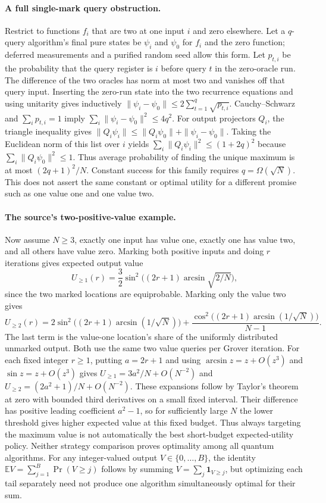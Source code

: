 \documentclass[11pt]{article}
\begin{document}
\paragraph{A full single-mark query obstruction.}
Restrict to functions $f_i$ that are two at one input $i$ and zero elsewhere.
Let a $q$-query algorithm's final pure states be $\psi_i$ and $\psi_0$ for
$f_i$ and the zero function; deferred measurements and a purified random
seed allow this form. Let $p_{t,i}$ be the probability that the query register
is $i$ before query $t$ in the zero-oracle run. The difference of the two
oracles has norm at most two and vanishes off that query input.
Inserting the zero-run state into the two recurrence equations and using
unitarity gives inductively
$\|\psi_i-\psi_0\|\le2\sum_{t=1}^q\sqrt{p_{t,i}}$.
Cauchy--Schwarz and $\sum_i p_{t,i}=1$ imply
$\sum_i\|\psi_i-\psi_0\|^2\le4q^2$.
For output projectors $Q_i$, the triangle inequality gives
$\|Q_i\psi_i\|\le\|Q_i\psi_0\|+\|\psi_i-\psi_0\|$.
Taking the Euclidean norm of this list over $i$ yields
$\sum_i\|Q_i\psi_i\|^2\le(1+2q)^2$ because
$\sum_i\|Q_i\psi_0\|^2\le1$. Thus average probability of finding the
unique maximum is at most $(2q+1)^2/N$. Constant success for this family
requires $q=\Omega(\sqrt N)$. This does not assert the same constant or
optimal utility for a different promise such as one value one and one value two.

\paragraph{The source's two-positive-value example.}
Now assume $N\ge3$, exactly one input has value one, exactly one has value
two, and all others have value zero. Marking both positive inputs and doing
$r$ iterations gives expected output value
\[
U_{\ge1}(r)=\frac32\sin^2\bigl((2r+1)\arcsin\sqrt{2/N}\bigr),
\]
since the two marked locations are equiprobable. Marking only the value two
gives
\[
U_{\ge2}(r)=2\sin^2\bigl((2r+1)\arcsin(1/\sqrt N)\bigr)
+\frac{\cos^2\bigl((2r+1)\arcsin(1/\sqrt N)\bigr)}{N-1}.
\]
The last term is the value-one location's share of the uniformly distributed
unmarked output. Both use the same two value queries per Grover iteration.
For each fixed integer $r\ge1$, putting $a=2r+1$ and using
$\arcsin z=z+O(z^3)$ and $\sin z=z+O(z^3)$ gives
$U_{\ge1}=3a^2/N+O(N^{-2})$ and
$U_{\ge2}=(2a^2+1)/N+O(N^{-2})$.
These expansions follow by Taylor's theorem at zero with bounded third
derivatives on a small fixed interval. Their difference has positive leading
coefficient $a^2-1$, so for sufficiently large $N$ the lower threshold gives
higher expected value at this fixed budget. Thus always targeting the maximum
value is not automatically the best short-budget expected-utility policy.
Neither strategy comparison proves optimality among all quantum algorithms.
For any integer-valued output $V\in\{0,\ldots,B\}$, the identity
$\mathbb E V=\sum_{j=1}^B\Pr(V\ge j)$ follows by summing
$V=\sum_j\mathbf1_{V\ge j}$, but optimizing each tail separately need not
produce one algorithm simultaneously optimal for their sum.
\end{document}
